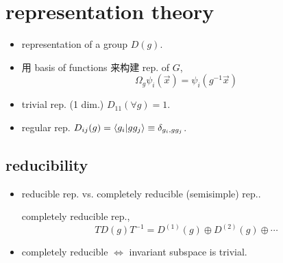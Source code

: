 \section{representation theory}
\begin{itemize}
	\item representation of a group $D(g)$.
	\item 用 basis of functions 来构建 rep. of $G$,
	\begin{equation}
		\Omega_g \psi_i(\vec{x}) = \psi_i(g^{-1} \vec{x})
	\end{equation}
	
	\item trivial rep. (1 dim.) $D_{1 1}(\forall g) = 1$.
	
	\item regular rep. $D_{i j}(g) = \braket{g_i | g g_j} \equiv \delta_{g_i, g g_j}$.
\end{itemize}

\subsection{reducibility}
\begin{itemize}
	\item reducible rep. vs. completely reducible (semisimple) rep..
	
	completely reducible rep.,
	\begin{equation}
		T D(g) T^{- 1} = D^{(1)}(g) \oplus D^{(2)}(g) \oplus \cdots
	\end{equation}
	
	\item completely reducible $\iff$ invariant subspace is trivial.
\end{itemize}

